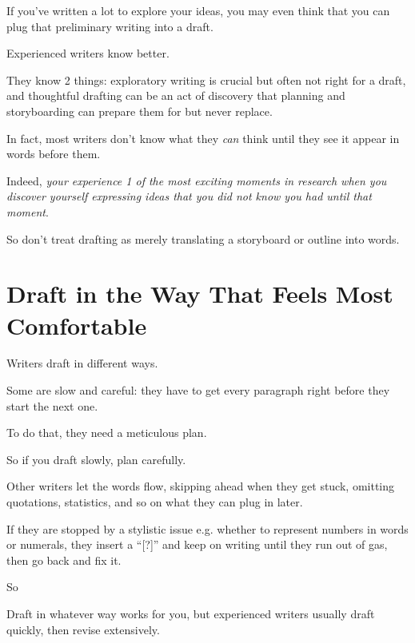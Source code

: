 \documentclass[oneside]{book}
\numberwithin{equation}{section}
\begin{document}
If you've written a lot to explore your ideas, you may even think that you can plug that preliminary writing into a draft.

Experienced writers know better.

They know 2 things: exploratory writing is crucial but often not right for a draft, and thoughtful drafting can be an act of discovery that planning and storyboarding can prepare them for but never replace.

In fact, most writers don't know what they \textit{can} think until they see it appear in words before them.

Indeed, \textit{your experience 1 of the most exciting moments in research when you discover yourself expressing ideas that you did not know you had until that moment}.

%
So don't treat drafting as merely translating a storyboard or outline into words.



\section{Draft in the Way That Feels Most Comfortable}
Writers draft in different ways.

Some are slow and careful: they have to get every paragraph right before they start the next one.

To do that, they need a meticulous plan.

So if you draft slowly, plan carefully.

Other writers let the words flow, skipping ahead when they get stuck, omitting quotations, statistics, and so on what they can plug in later.

If they are stopped by a stylistic issue e.g. whether to represent numbers in words or numerals, they insert a ``[?]'' and keep on writing until they run out of gas, then go back and fix it.


So 

Draft in whatever way works for you, but experienced writers usually draft quickly, then revise extensively.
\end{document}
